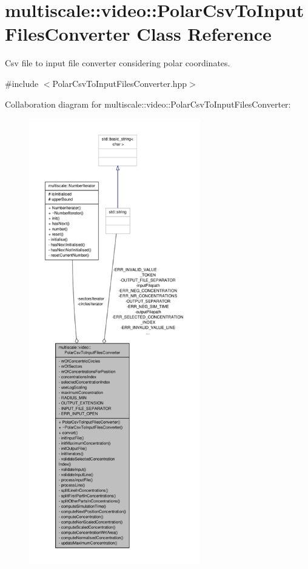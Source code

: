 \hypertarget{classmultiscale_1_1video_1_1PolarCsvToInputFilesConverter}{\section{multiscale\-:\-:video\-:\-:Polar\-Csv\-To\-Input\-Files\-Converter Class Reference}
\label{classmultiscale_1_1video_1_1PolarCsvToInputFilesConverter}
}


Csv file to input file converter considering polar coordinates.  




{\ttfamily \#include $<$Polar\-Csv\-To\-Input\-Files\-Converter.\-hpp$>$}



Collaboration diagram for multiscale\-:\-:video\-:\-:Polar\-Csv\-To\-Input\-Files\-Converter\-:\nopagebreak
\begin{figure}[H]
\begin{center}
\leavevmode
\includegraphics[height=550pt]{classmultiscale_1_1video_1_1PolarCsvToInputFilesConverter__coll__graph}
\end{center}
\end{figure}
